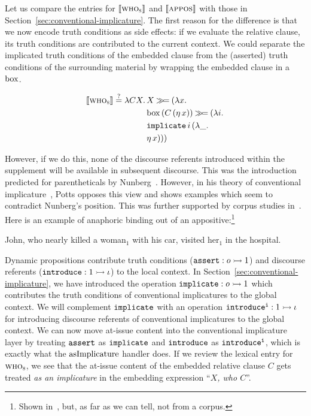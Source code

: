 Let us compare the entries for $\llbracket \textsc{who}_{\textsc{s}} \rrbracket$ and
$\llbracket \textsc{appos} \rrbracket$ with those in
Section~\ref{sec:conventional-implicature}. The first reason for the
difference is that we now encode truth conditions as side effects: if we
evaluate the relative clause, its truth conditions are contributed to the
current context. We could separate the implicated truth conditions of the
embedded clause from the (asserted) truth conditions of the surrounding
material by wrapping the embedded clause in a $\mathrm{box}$.

$$
\llbracket \textsc{who}_{\textsc{s}} \rrbracket \stackrel{?}{=} \lambda C X.\, \begin{aligned}[t]
    &X \mathbin{\gg\!=} (\lambda x.\,  \\
    &\mathrm{box}\,(C\,(\eta\,x)) \mathbin{\gg\!=} (\lambda i.\,  \\
    &\mathtt{implicate}\,i\,(\lambda \_.\,  \\
    &\eta\,x)))
  \end{aligned}
$$

However, if we do this, none of the discourse referents introduced within
the supplement will be available in subsequent discourse. This was the
introduction predicted for parentheticals by
Nunberg~\cite{nunberg1990linguistics}. However, in his theory of
conventional implicature~\cite{potts2005logic}, Potts opposes this view and
shows examples which seem to contradict Nunberg's position. This was
further supported by corpus studies in~\cite{anderbois2010crossing}. Here
is an example of anaphoric binding out of an appositive:\footnote{Shown
  in~\cite{anderbois2010crossing}, but, as far as we can tell, not from a
  corpus.}

\begin{exe}
  \ex John, who nearly killed a woman$_1$ with his car, visited her$_1$ in
  the hospital. \label{ex:hospital}
\end{exe}

Dynamic propositions contribute truth conditions ($\mathtt{assert} : o \rightarrowtail 1$)
and discourse referents ($\mathtt{introduce} : 1 \rightarrowtail \iota$) to the local
context. In Section~\ref{sec:conventional-implicature}, we have introduced
the operation $\mathtt{implicate} : o \rightarrowtail 1$ which contributes the truth
conditions of conventional implicatures to the global context. We will
complement $\mathtt{implicate}$ with an operation
$\mathtt{introduce^i} : 1 \rightarrowtail \iota$ for introducing discourse referents of
conventional implicatures to the global context. We can now move at-issue
content into the conventional implicature layer by treating $\mathtt{assert}$
as $\mathtt{implicate}$ and $\mathtt{introduce}$ as $\mathtt{introduce^i}$, which is
exactly what the $\operatorname{asImplicature}$ handler does. If we review the lexical
entry for $\textsc{who}_{\textsc{s}}$, we see that the at-issue content of the
embedded relative clause $C$ gets treated \emph{as an implicature} in the
embedding expression ``\emph{$X$, who $C$}''.

